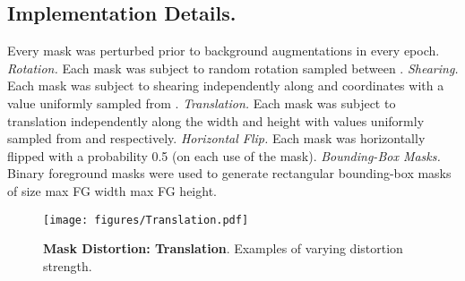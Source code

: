 \documentclass[twoside,11pt]{article}
\begin{document}
\subsection{Implementation Details.} Every mask was perturbed prior to background augmentations in every epoch. {\it Rotation.} Each mask was subject to random rotation sampled between . {\it Shearing.} Each mask was subject to shearing independently along  and  coordinates with a value uniformly sampled from . 
{\it Translation.} Each mask was subject to translation independently along the width and height with values uniformly sampled from  and  respectively. {\it Horizontal Flip.} Each mask was horizontally flipped with a probability 0.5 (on each use of the mask). {\it Bounding-Box Masks.} Binary foreground masks were used to generate rectangular bounding-box masks of size max FG width  max FG height.


\begin{figure}
    \centering
    \texttt{[image: figures/Translation.pdf]}
    \caption{{\bf Mask Distortion: Translation}. Examples of varying distortion strength.}
    \label{fig: traslation}
\end{figure}
\end{document}
